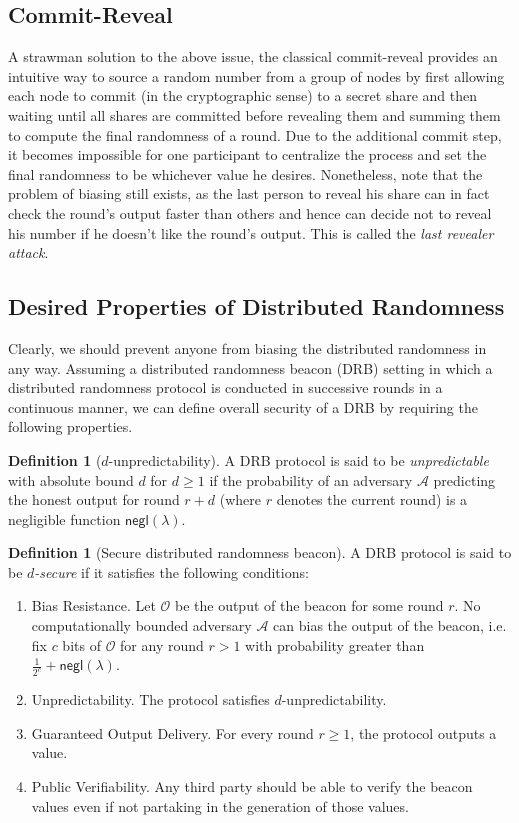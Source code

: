 \documentclass[11pt]{article}
\theoremstyle{definition}
\newtheorem{definition}[theorem]{Definition}
\theoremstyle{remark}
\begin{document}
\subsection{Commit-Reveal}
A strawman solution to the above issue, the classical commit-reveal provides an intuitive way to source a random number from a group of nodes by first allowing each node to commit (in the cryptographic sense) to a secret share and then waiting until all shares are committed before revealing them and summing them to compute the final randomness of a round. Due to the additional commit step, it becomes impossible for one participant to centralize the process and set the final randomness to be whichever value he desires. Nonetheless, note that the problem of biasing still exists, as the last person to reveal his share can in fact check the round's output faster than others and hence can decide not to reveal his number if he doesn't like the round's output. This is called the \textit{last revealer attack}.

\subsection{Desired Properties of Distributed Randomness}
Clearly, we should prevent anyone from biasing the distributed randomness in any way. Assuming a distributed randomness beacon (DRB) setting in which a distributed randomness protocol is conducted in successive rounds in a continuous manner, we can define overall security of a DRB by requiring the following properties.

\begin{definition}[$d$-unpredictability]
A DRB protocol is said to be \textit{unpredictable} with absolute bound $d$ for $d \geq 1$ if the probability of an adversary $\mathcal{A}$ predicting the honest output for round $r + d$ (where $r$ denotes the current round) is a negligible function $\mathsf{negl}(\lambda)$.
\end{definition}

\begin{definition}[Secure distributed randomness beacon]
A DRB protocol is said to be \textit{$d$-secure} if it satisfies the following conditions:
\begin{enumerate}
\item Bias Resistance. Let $\mathcal{O}$ be the output of the beacon for some round $r$. No computationally bounded adversary $\mathcal{A}$ can bias the output of the beacon, i.e. fix $c$ bits of $\mathcal{O}$ for any round $r > 1$ with probability greater than $\frac{1}{2^c} + \mathsf{negl}(\lambda)$.
\item Unpredictability. The protocol satisfies $d$-unpredictability.
\item Guaranteed Output Delivery. For every round $r \geq 1$, the protocol outputs a value.
\item Public Verifiability. Any third party should be able to verify the beacon values even if not partaking in the generation of those values.
\end{enumerate}
\end{definition}
\end{document}

